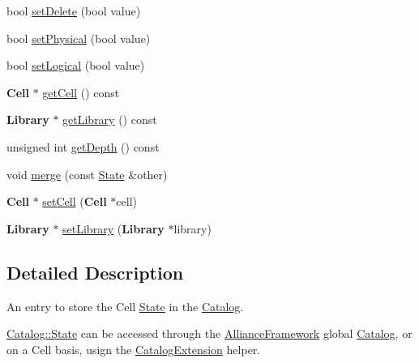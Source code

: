 \begin{DoxyCompactItemize}
bool \hyperlink{classCRL_1_1Catalog_1_1State_a53873a1a42083389dfae02b46b3f2de3}{set\-Delete} (bool value)
\item 
bool \hyperlink{classCRL_1_1Catalog_1_1State_a85a091727c8e7de2b16d01088324de0d}{set\-Physical} (bool value)
\item 
bool \hyperlink{classCRL_1_1Catalog_1_1State_af41327abeb4e7646ef5cafabe8eeabd0}{set\-Logical} (bool value)
\item 
{\bf Cell} $\ast$ \hyperlink{classCRL_1_1Catalog_1_1State_a09c92d08796c465ce5e3a3af56867b8d}{get\-Cell} () const 
\item 
{\bf Library} $\ast$ \hyperlink{classCRL_1_1Catalog_1_1State_a9181d84d102ce74e640e5f3c558191ce}{get\-Library} () const 
\item 
unsigned int \hyperlink{classCRL_1_1Catalog_1_1State_a5b7fbd21f95bdb6ae1cf4b833c9c9729}{get\-Depth} () const 
\item 
void \hyperlink{classCRL_1_1Catalog_1_1State_a41fde67f1b88de06cae113a0d8108f25}{merge} (const \hyperlink{classCRL_1_1Catalog_1_1State}{State} \&other)
\item 
{\bf Cell} $\ast$ \hyperlink{classCRL_1_1Catalog_1_1State_a156714ad3fe2e5bb8ad8549d101526fe}{set\-Cell} ({\bf Cell} $\ast$cell)
\item 
{\bf Library} $\ast$ \hyperlink{classCRL_1_1Catalog_1_1State_a821ac2ae33f0045232cab612ab12f84b}{set\-Library} ({\bf Library} $\ast$library)
\end{DoxyCompactItemize}


\subsection{Detailed Description}
An entry to store the Cell \hyperlink{classCRL_1_1Catalog_1_1State}{State} in the \hyperlink{classCRL_1_1Catalog}{Catalog}. 

\hyperlink{classCRL_1_1Catalog_1_1State}{Catalog\-::\-State} can be accessed through the \hyperlink{classCRL_1_1AllianceFramework}{Alliance\-Framework} global \hyperlink{classCRL_1_1Catalog}{Catalog}, or on a Cell basis, usign the \hyperlink{classCRL_1_1CatalogExtension}{Catalog\-Extension} helper. 

